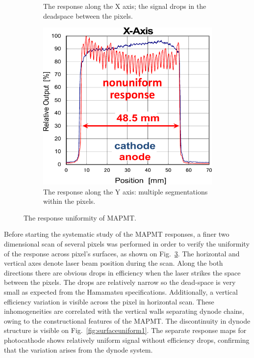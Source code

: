 \begin{figure}[b]
\begin{subfigure}{0.3\linewidth}
		\caption{The response along the X axis; the signal drops in the deadspace between the pixels.}
		\label{fig:surfaceuniform2}
	\end{subfigure}
	\quad
	\begin{subfigure}{0.3\linewidth}
		\includegraphics[width=\textwidth]{figures/surfaceuniform2.pdf}
		\caption{The response along the Y axis: multiple segmentations within the pixels.}
		\label{fig:surfaceuniform3}
	\end{subfigure}
	\caption{The response uniformity of MAPMT.}
	\label{fig:surfaceuniform}
\end{figure}


Before starting the systematic study of the MAPMT responses, a finer two dimensional scan of several pixels was performed in order to verify the uniformity of the response across pixel's surfaces, as shown on Fig.~\ref{fig:surfaceuniform}.
The horizontal and vertical axes denote laser beam position during the scan.
Along the both directions there are obvious drops in efficiency when the laser strikes the space between the pixels.
The drops are relatively narrow so the dead-space is very small as expected from the Hamamatsu specifications.
Additionally, a vertical efficiency variation is visible across the pixel in horizontal scan.
These inhomogeneities are correlated with the vertical walls separating dynode chains, owing to the constructional features of the MAPMT. The discontinuity in dynode structure is visible  on Fig.~\ref{fig:surfaceuniform1}.
The separate response maps for photocathode shows relatively uniform signal without efficiency drops, confirming that the variation arises from the dynode system.
